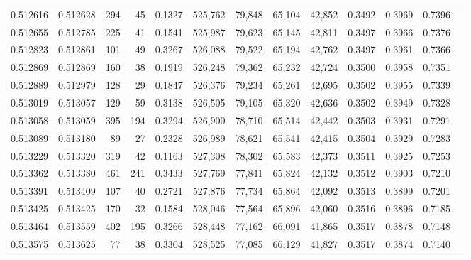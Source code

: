 \begin{tabular}{rrrrrrrrrrrrr}
0.512616 & 0.512628 &   294 &    45 &                                     0.1327 & 525,762 &  79,848 &  65,104 &  42,852 & 0.3492 & 0.3969 & 0.7396 \\
0.512655 & 0.512785 &   225 &    41 &                                     0.1541 & 525,987 &  79,623 &  65,145 &  42,811 & 0.3497 & 0.3966 & 0.7376 \\
0.512823 & 0.512861 &   101 &    49 &                                     0.3267 & 526,088 &  79,522 &  65,194 &  42,762 & 0.3497 & 0.3961 & 0.7366 \\
0.512869 & 0.512869 &   160 &    38 &                                     0.1919 & 526,248 &  79,362 &  65,232 &  42,724 & 0.3500 & 0.3958 & 0.7351 \\
0.512889 & 0.512979 &   128 &    29 &                                     0.1847 & 526,376 &  79,234 &  65,261 &  42,695 & 0.3502 & 0.3955 & 0.7339 \\
0.513019 & 0.513057 &   129 &    59 &                                     0.3138 & 526,505 &  79,105 &  65,320 &  42,636 & 0.3502 & 0.3949 & 0.7328 \\
0.513058 & 0.513059 &   395 &   194 &                                     0.3294 & 526,900 &  78,710 &  65,514 &  42,442 & 0.3503 & 0.3931 & 0.7291 \\
0.513089 & 0.513180 &    89 &    27 &                                     0.2328 & 526,989 &  78,621 &  65,541 &  42,415 & 0.3504 & 0.3929 & 0.7283 \\
0.513229 & 0.513320 &   319 &    42 &                                     0.1163 & 527,308 &  78,302 &  65,583 &  42,373 & 0.3511 & 0.3925 & 0.7253 \\
0.513362 & 0.513380 &   461 &   241 &                                     0.3433 & 527,769 &  77,841 &  65,824 &  42,132 & 0.3512 & 0.3903 & 0.7210 \\
0.513391 & 0.513409 &   107 &    40 &                                     0.2721 & 527,876 &  77,734 &  65,864 &  42,092 & 0.3513 & 0.3899 & 0.7201 \\
0.513425 & 0.513425 &   170 &    32 &                                     0.1584 & 528,046 &  77,564 &  65,896 &  42,060 & 0.3516 & 0.3896 & 0.7185 \\
0.513464 & 0.513559 &   402 &   195 &                                     0.3266 & 528,448 &  77,162 &  66,091 &  41,865 & 0.3517 & 0.3878 & 0.7148 \\
0.513575 & 0.513625 &    77 &    38 &                                     0.3304 & 528,525 &  77,085 &  66,129 &  41,827 & 0.3517 & 0.3874 & 0.7140 \\

\end{tabular}
